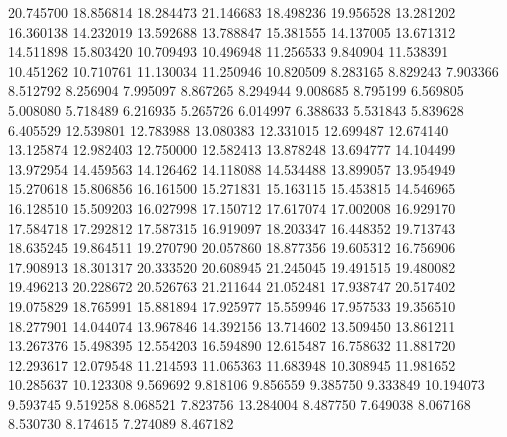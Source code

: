 20.745700
18.856814
18.284473
21.146683
18.498236
19.956528
13.281202
16.360138
14.232019
13.592688
13.788847
15.381555
14.137005
13.671312
14.511898
15.803420
10.709493
10.496948
11.256533
9.840904
11.538391
10.451262
10.710761
11.130034
11.250946
10.820509
8.283165
8.829243
7.903366
8.512792
8.256904
7.995097
8.867265
8.294944
9.008685
8.795199
6.569805
5.008080
5.718489
6.216935
5.265726
6.014997
6.388633
5.531843
5.839628
6.405529
12.539801
12.783988
13.080383
12.331015
12.699487
12.674140
13.125874
12.982403
12.750000
12.582413
13.878248
13.694777
14.104499
13.972954
14.459563
14.126462
14.118088
14.534488
13.899057
13.954949
15.270618
15.806856
16.161500
15.271831
15.163115
15.453815
14.546965
16.128510
15.509203
16.027998
17.150712
17.617074
17.002008
16.929170
17.584718
17.292812
17.587315
16.919097
18.203347
16.448352
19.713743
18.635245
19.864511
19.270790
20.057860
18.877356
19.605312
16.756906
17.908913
18.301317
20.333520
20.608945
21.245045
19.491515
19.480082
19.496213
20.228672
20.526763
21.211644
21.052481
17.938747
20.517402
19.075829
18.765991
15.881894
17.925977
15.559946
17.957533
19.356510
18.277901
14.044074
13.967846
14.392156
13.714602
13.509450
13.861211
13.267376
15.498395
12.554203
16.594890
12.615487
16.758632
11.881720
12.293617
12.079548
11.214593
11.065363
11.683948
10.308945
11.981652
10.285637
10.123308
9.569692
9.818106
9.856559
9.385750
9.333849
10.194073
9.593745
9.519258
8.068521
7.823756
13.284004
8.487750
7.649038
8.067168
8.530730
8.174615
7.274089
8.467182
